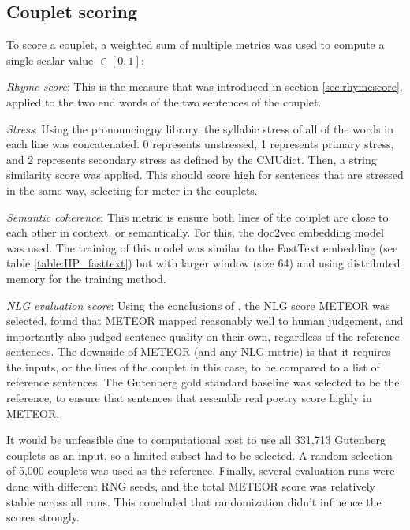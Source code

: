 \documentclass[11pt,a4paper]{article}
\newenvironment{tight_itemize}{
\begin{itemize}
\setlength{\itemsep}{0pt}
\setlength{\parskip}{0pt}
}{\end{itemize}}
\begin{document}
\subsection{Couplet scoring}
\label{sec:coupletscore}
To score a couplet, a weighted sum of multiple metrics was used to compute a single scalar value $\in [0, 1]$:
\begin{tight_itemize}
	\vspace{-0.5em}
	\item \textit{Rhyme score}: This is the measure that was introduced in section \ref{sec:rhymescore}, applied to the two end words of the two sentences of the couplet.
	\item \textit{Stress}: Using the pronouncingpy library, the syllabic stress of all of the words in each line was concatenated. 0 represents unstressed, 1 represents primary stress, and 2 represents secondary stress as defined by the CMUdict. Then, a string similarity score \cite{ratcliff} was applied. This should score high for sentences that are stressed in the same way, selecting for meter in the couplets.
	\item \textit{Semantic coherence}: This metric is ensure both lines of the couplet are close to each other in context, or semantically. For this, the doc2vec embedding model \cite{docvec} was used. The training of this model was similar to the FastText embedding (see table \ref{table:HP_fasttext}) but with larger window (size 64) and using distributed memory for the training method.
	\item \textit{NLG evaluation score}: Using the conclusions of \citet{nlgeval}, the NLG score METEOR \cite{meteor} was selected. \citet{nlgeval} found that METEOR mapped reasonably well to human judgement, and importantly also judged sentence quality on their own, regardless of the reference sentences. The downside of METEOR (and any NLG metric) is that it requires the inputs, or the lines of the couplet in this case, to be compared to a list of reference sentences. The Gutenberg gold standard baseline was selected to be the reference, to ensure that sentences that resemble real poetry score highly in METEOR.

		It would be unfeasible due to computational cost to use all 331,713 Gutenberg couplets as an input, so a limited subset had to be selected. A random selection of 5,000 couplets was used as the reference. Finally, several evaluation runs were done with different RNG seeds, and the total METEOR score was relatively stable across all runs. This concluded that randomization didn't influence the scores strongly.
\end{tight_itemize}
\end{document}
